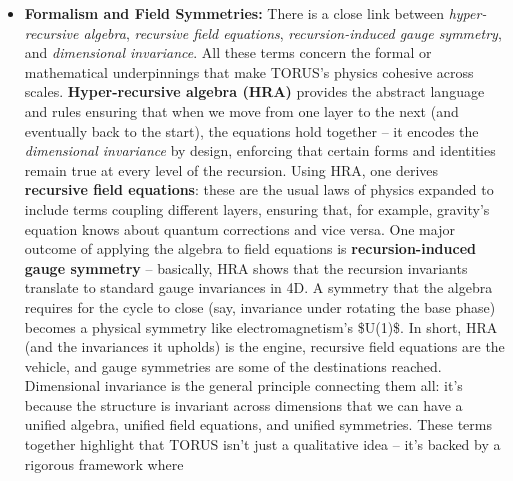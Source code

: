 \documentclass[
]{article}
\begin{document}
{\begin{itemize}
  one \emph{consequence} (a subtle observable phenomenon stemming from
  that framework). They overlap in that both emphasize the
  non-separability of observer and observed -- but while observer-state
  is a broad, structural concept (used in things like defining OSQNs or
  building recursive AGIs), observer coherence is a specific physical
  \emph{manifestation} to test (like the two-slit thought experiment's
  tiny fringe changes). Together, they illustrate TORUS's move to
  \textbf{erase the boundary between observer and system}, bringing
  measurement into the fold of fundamental theory.
\item
  \textbf{Formalism and Field Symmetries:} There is a close link between
  \emph{hyper-recursive algebra}, \emph{recursive field equations},
  \emph{recursion-induced gauge symmetry}, and \emph{dimensional
  invariance}. All these terms concern the formal or mathematical
  underpinnings that make TORUS's physics cohesive across scales.
  \textbf{Hyper-recursive algebra (HRA)} provides the abstract language
  and rules ensuring that when we move from one layer to the next (and
  eventually back to the start), the equations hold together -- it
  encodes the \emph{dimensional invariance} by design, enforcing that
  certain forms and identities remain true at every level of the
  recursion\hspace{0pt}. Using HRA, one derives \textbf{recursive field
  equations}: these are the usual laws of physics expanded to include
  terms coupling different layers, ensuring that, for example, gravity's
  equation knows about quantum corrections and vice versa\hspace{0pt}.
  One major outcome of applying the algebra to field equations is
  \textbf{recursion-induced gauge symmetry} -- basically, HRA shows that
  the recursion invariants translate to standard gauge invariances in
  4D\hspace{0pt}. A symmetry that the algebra requires for the cycle to
  close (say, invariance under rotating the base phase) becomes a
  physical symmetry like electromagnetism's \$U(1)\$. In short, HRA (and
  the invariances it upholds) is the engine, recursive field equations
  are the vehicle, and gauge symmetries are some of the destinations
  reached. Dimensional invariance is the general principle connecting
  them all: it's because the structure is invariant across dimensions
  that we can have a unified algebra, unified field equations, and
  unified symmetries. These terms together highlight that TORUS isn't
  just a qualitative idea -- it's backed by a rigorous framework where

\end{itemize}}
\end{document}
